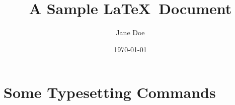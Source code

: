 

\title{A Sample \LaTeX ~Document}		%

\author{Jane Doe}					%

\date{\today}				%


\maketitle		%

\section{Some Typesetting Commands}		%
									
